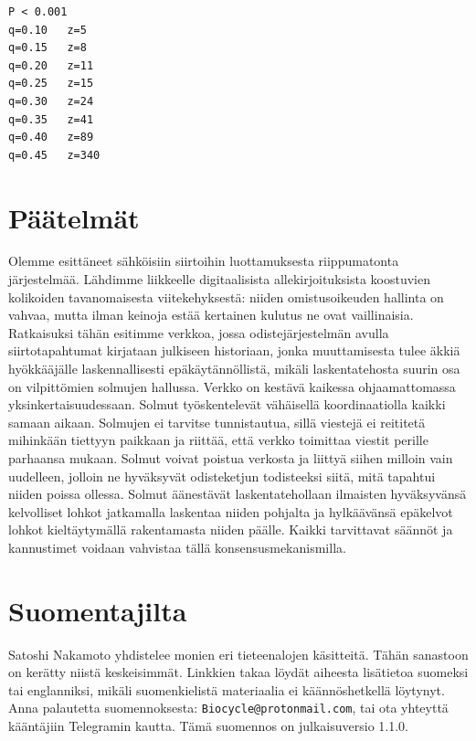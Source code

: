 \documentclass{article}
\begin{document}
\begin{verbatim}
P < 0.001
q=0.10   z=5
q=0.15   z=8
q=0.20   z=11
q=0.25   z=15
q=0.30   z=24
q=0.35   z=41
q=0.40   z=89
q=0.45   z=340
\end{verbatim}

\section{Päätelmät}

Olemme esittäneet sähköisiin siirtoihin luottamuksesta riippumatonta jär\-jes\-tel\-mää. Lähdimme liikkeelle digitaalisista allekirjoituksista koostuvien kolikoiden tavanomaisesta viitekehyksestä: niiden omistusoikeuden hallinta on vahvaa, mutta ilman keinoja estää kertainen kulutus ne ovat vaillinaisia. Ratkaisuksi tähän esitimme verkkoa, jossa odistejärjestelmän avulla siirtotapahtumat kirjataan julkiseen historiaan, jonka muuttamisesta tulee äkkiä hyökkääjälle laskennallisesti epäkäytännöllistä, mikäli laskentatehosta suurin osa on vilpittömien solmujen hallussa. Verkko on kestävä kaikessa ohjaamattomassa yksinkertaisuudessaan. Solmut työskentelevät vähäisellä koordinaatiolla kaikki samaan aikaan. Solmujen ei tarvitse tunnistautua, sillä viestejä ei reititetä mihinkään tiettyyn paikkaan ja riittää, että verkko toimittaa viestit perille parhaansa mukaan. Solmut voivat poistua verkosta ja liittyä siihen milloin vain uudelleen, jolloin ne hyväksyvät odisteketjun todisteeksi siitä, mitä tapahtui niiden poissa ollessa. Solmut äänestävät laskentatehollaan ilmaisten hyväksyvänsä kelvolliset lohkot jatkamalla laskentaa niiden pohjalta ja hylkäävänsä epäkelvot lohkot kieltäytymällä rakentamasta niiden päälle. Kaikki tarvittavat säännöt ja kannustimet voidaan vahvistaa tällä konsensusmekanismilla.
\newpage
\printbibliography

\newpage

\section*{Suomentajilta}

Satoshi Nakamoto yhdistelee monien eri tieteenalojen käsitteitä. Tähän sanastoon on kerätty niistä keskeisimmät. Linkkien takaa löydät aiheesta lisätietoa suomeksi tai englanniksi, mikäli suomenkielistä materiaalia ei käännöshetkellä löytynyt. Anna palautetta suomennoksesta: \texttt{Biocycle@protonmail.com}, tai ota yhteyttä kääntäjiin Telegramin kautta. Tämä suomennos on julkaisuversio 1.1.0.

\glsnogroupskiptrue
\printglossary
\end{document}
